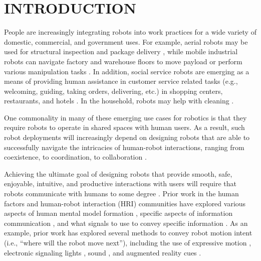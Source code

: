 \documentclass[letterpaper, 10 pt, conference]{ieeeconf}  %
\begin{document}
\section{INTRODUCTION}
People are increasingly integrating robots into work practices for a wide variety of domestic, commercial, and government uses. For example, aerial robots may be used for structural inspection \cite{chan2015towards} and package delivery \cite{d2014guest}, while mobile industrial robots can navigate factory and warehouse floors to move payload \cite{wurman2008coordinating} or perform various manipulation tasks \cite{datta2008development, hvilshoj2011little}. In addition, social service robots are emerging as a means of providing human assistance in customer service related tasks (e.g., welcoming, guiding, taking orders, delivering, etc.) in shopping centers, restaurants, and hotels \cite{acosta2006design, datta2011pilot, kanda2009affective, osawa2017real, zalama2014sacarino}. In the household, robots may help with cleaning \cite{forlizzi2006service}.

One commonality in many of these emerging use cases for robotics is that they require robots to operate in shared spaces with human users. As a result, such robot deployments will increasingly depend on designing robots that are able to successfully navigate the intricacies of human-robot interactions, ranging from coexistence, to coordination, to collaboration \cite{cha2018survey}. 

Achieving the ultimate goal of designing robots that provide smooth, safe, enjoyable, intuitive, and productive interactions with users will require that robots communicate with humans to some degree \cite{cha2018survey, khatib1999robots}. %
Prior work in the human factors and human-robot interaction (HRI) communities have explored various aspects of human mental model formation \cite{aggarwal2011human}, specific aspects of information communication \cite{arras2005we, bauer2008human}, and what signals to use to convey specific information \cite{cha2018survey}. As an example, prior work has explored several methods to convey robot motion intent (i.e., ``where will the robot move next''), including the use of expressive motion \cite{Zhou:2017}, electronic signaling lights \cite{szafir2015communicating}, sound \cite{cha2018effects}, and augmented reality cues \cite{walker2018communicating,hedayati2018improving,8673306}. 
\end{document}
